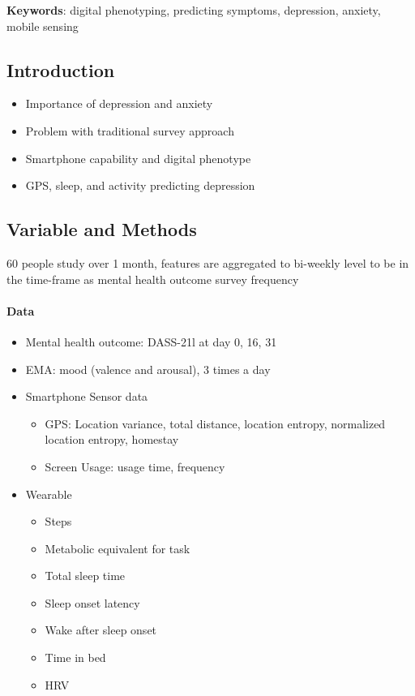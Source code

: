 \textbf{Keywords}: digital phenotyping, predicting symptoms, depression, anxiety, mobile sensing

\subsection{Introduction}
\begin{itemize}
    \item Importance of depression and anxiety 
    \item Problem with traditional survey approach 
    \item Smartphone capability and digital phenotype 
    \item GPS, sleep, and activity predicting depression 
\end{itemize}

\subsection{Variable and Methods} 
60 people study over 1 month, features are aggregated to bi-weekly level to be in the time-frame as mental health outcome survey frequency 
\paragraph{Data}
    \begin{itemize}
        \item Mental health outcome: DASS-21l at day 0, 16, 31
        \item EMA: mood (valence and arousal), 3 times a day
        \item Smartphone Sensor data 
            \begin{itemize}
                \item GPS: Location variance, total distance, location entropy, normalized location entropy, homestay 
                \item Screen Usage: usage time, frequency 
            \end{itemize}
        \item Wearable
            \begin{itemize}
                \item Steps 
                \item Metabolic equivalent for task
                \item Total sleep time 
                \item Sleep onset latency 
                \item Wake after sleep onset 
                \item Time in bed 
                \item HRV 
            \end{itemize}
    \end{itemize}
